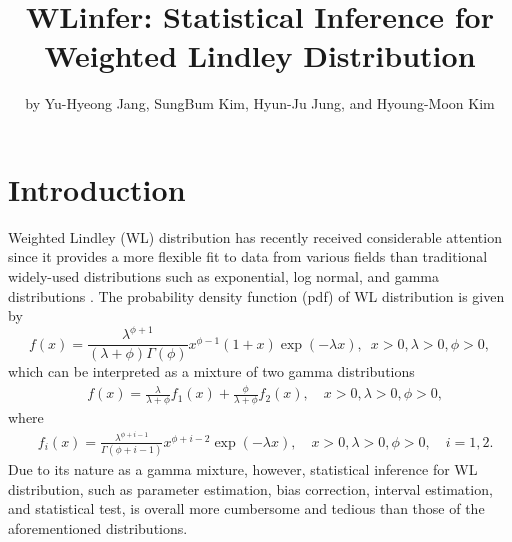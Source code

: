 \title{WLinfer: Statistical Inference for Weighted Lindley Distribution}
\author{by Yu-Hyeong Jang, SungBum Kim, Hyun-Ju Jung, and Hyoung-Moon Kim}

\maketitle


\section{Introduction}

Weighted Lindley (WL) distribution has recently received considerable attention since it provides a more flexible fit to data from various fields than traditional widely-used distributions such as exponential, log normal, and gamma distributions \citep{ghitany:2011,mazucheli:2013}.
The probability density function (pdf) of WL distribution is given by
\begin{equation*}
f(x) = \frac{\lambda^{\phi+1}}{(\lambda+\phi)\Gamma(\phi)}{x}^{\phi-1}(1+{x})\exp(-\lambda {x}),
\hspace{6pt}x>0,\lambda>0,\phi>0,
\end{equation*} 
which can be interpreted as a mixture of two gamma distributions
\begin{equation*}
\begin{aligned}
&f(x) = \frac{\lambda}{\lambda+\phi}f_{1}(x)+\frac{\phi}{\lambda+\phi}f_{2}(x),\quad x>0,\lambda>0,\phi>0,
\end{aligned}
\end{equation*}
where
\begin{equation*}
\begin{aligned}
&f_{i}(x) = \frac{\lambda^{\phi+i-1}}{\Gamma(\phi+i-1)}x^{\phi+i-2} \exp (-\lambda x),\quad x>0,\lambda>0,\phi>0,\quad i=1,2.
\end{aligned}
\end{equation*}  
Due to its nature as a gamma mixture, however, statistical inference for WL distribution, such as parameter estimation, bias correction, interval estimation, and statistical test, is overall more cumbersome and tedious than those of the aforementioned distributions. 

